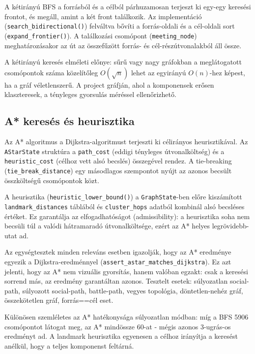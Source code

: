 ﻿\documentclass[a4paper,12pt]{report}
\begin{document}
A kétirányú BFS a forrásból és a célból párhuzamosan terjeszt ki egy-egy keresési frontot, és megáll, amint a két front találkozik. Az implementáció (\texttt{search\_bidirectional()}) felváltva bővíti a forrás-oldali és a cél-oldali sort (\texttt{expand\_frontier()}). A találkozási csomópont (\texttt{meeting\_node}) meghatározásakor az út az összefűzött forrás- és cél-részútvonalakból áll össze.

A kétirányú keresés elméleti előnye: sűrű vagy nagy gráfokban a meglátogatott csomópontok száma közelítőleg $O(\sqrt{n})$ lehet az egyirányú $O(n)$-hez képest, ha a gráf véletlenszerű. A project gráfján, ahol a komponensek erősen klaszteresek, a tényleges gyorsulás méréssel ellenőrizhető.

\subsection{A* keresés és heurisztika}

Az A* \cite{hart1968} algoritmus a Dijkstra-algoritmust terjeszti ki célirányos heurisztikával. Az \texttt{AStarState} struktúra a \texttt{path\_cost} (eddigi tényleges útvonalköltség) és a \texttt{heuristic\_cost} (célhoz vett alsó becslés) összegével rendez. A tie-breaking (\texttt{tie\_break\_distance}) egy másodlagos szempontot nyújt az azonos becsült összköltségű csomópontok közt.

A heurisztika (\texttt{heuristic\_lower\_bound()}) a \texttt{GraphState}-ben előre kiszámított \texttt{landmark\_distances} táblából és \texttt{cluster\_hops} adatból kombinál alsó becsléses értéket. Ez garantálja az elfogadhatóságot (admissibility): a heurisztika soha nem becsüli túl a valódi hátramaradó útvonalköltsége, ezért az A* helyes legrövidebb-utat ad.

Az egységtesztek minden releváns esetben igazolják, hogy az A* eredménye egyezik a Dijkstra-eredménnyel (\texttt{assert\_astar\_matches\_dijkstra}). Ez azt jelenti, hogy az A* nem vizuális gyorsítás, hanem valóban egzakt: csak a keresési sorrend más, az eredmény garantáltan azonos. Tesztelt esetek: súlyozatlan social-path, súlyozott social-path, battle-path, vegyes topológia, döntetlen-nehéz gráf, összekötetlen gráf, forrás==cél eset.

Különösen szemléletes az A* hatékonysága súlyozatlan módban: míg a BFS 5906 csomópontot látogat meg, az A* mindössze 60-at - mégis azonos 3-ugrás-os eredményt ad. A landmark heurisztika egyenesen a célhoz irányítja a keresést anélkül, hogy a teljes komponenst feltárná.
\end{document}
